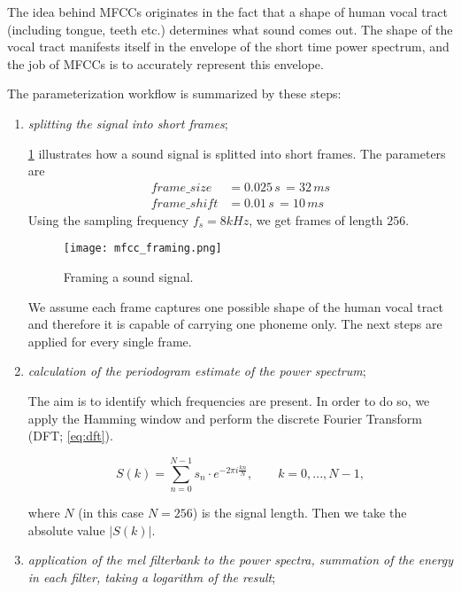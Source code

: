 The idea behind MFCCs originates in the fact that a shape of human vocal tract (including tongue, teeth etc.) determines what sound comes out. The shape of the vocal tract manifests itself in the envelope of the short time power spectrum, and the job of MFCCs is to accurately represent this envelope.

The parameterization workflow is summarized by these steps:

\begin{enumerate}
\item \textit{splitting the signal into short frames};

\cref{fig:methods:mfcc_framing} illustrates how a sound signal is splitted into short frames. The parameters are
\begin{align*}
frame\_size &= 0.025 \,s \,= 32 \,ms \\
frame\_shift &= 0.01 \,s \,= 10 \,ms
\end{align*}
Using the sampling frequency $ f_s = 8 kHz $, we get frames of length $ 256 $.

\begin{figure}[H]
\centering
\texttt{[image: mfcc\_framing.png]}
\caption{Framing a sound signal.}
\label{fig:methods:mfcc_framing}
\end{figure}

We assume each frame captures one possible shape of the human vocal tract and therefore it is capable of carrying one phoneme only. The next steps are applied for every single frame.

\item \textit{calculation of the periodogram estimate of the power spectrum}; 

The aim is to identify which frequencies are present. In order to do so, we apply the Hamming window and perform the discrete Fourier Transform (DFT; \cref{eq:dft}).

\begin{equation} \label{eq:dft}
S(k) = \displaystyle\sum_{n=0}^{N-1} s_n \cdot e^{-2 \pi i \frac{kn}{N}}, \qquad k = 0, ..., N-1, 
\end{equation}

where $ N $ (in this case $ N = 256 $) is the signal length. Then we take the absolute value $ |S(k)| $.

\item \textit{application of the mel filterbank to the power spectra, summation of the energy in each filter, taking a logarithm of the result};


\end{enumerate}
